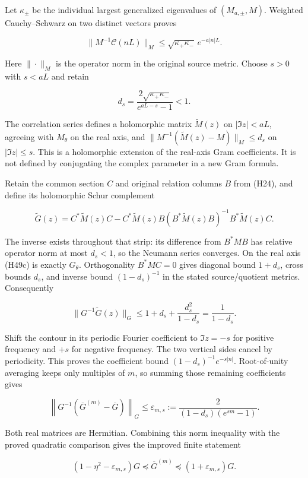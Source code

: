 \documentclass[
]{article}
\begin{document}
Let \(\kappa_\pm\) be the individual largest generalized eigenvalues of
\((M_{a,\pm},M)\). Weighted Cauchy--Schwarz on two distinct vectors
proves

\[
 \|M^{-1}\mathcal C(nL)\|_M
 \leq\sqrt{\kappa_+\kappa_-}\,e^{-a|n|L}.
 \tag{H49a}
\]

Here \(\|\cdot\|_M\) is the operator norm in the original source metric.
Choose \(s>0\) with \(s<aL\) and retain

\[
 d_s=\frac{2\sqrt{\kappa_+\kappa_-}}{e^{aL-s}-1}<1.
 \tag{H49b}
\]

The correlation series defines a holomorphic matrix \(\widetilde M(z)\)
on \(|\Im z|<aL\), agreeing with \(M_\theta\) on the real axis, and
\(\|M^{-1}(\widetilde M(z)-M)\|_M\leq d_s\) on \(|\Im z|\leq s\). This
is a holomorphic extension of the real-axis Gram coefficients. It is not
defined by conjugating the complex parameter in a new Gram formula.

Retain the common section \(C\) and original relation columns \(B\) from
(H24), and define its holomorphic Schur complement

\[
 \widetilde G(z)=C^*\widetilde M(z)C
 -C^*\widetilde M(z)B
 (B^*\widetilde M(z)B)^{-1}B^*\widetilde M(z)C.
 \tag{H49c}
\]

The inverse exists throughout that strip: its difference from \(B^*MB\)
has relative operator norm at most \(d_s<1\), so the Neumann series
converges. On the real axis (H49c) is exactly \(G_\theta\).
Orthogonality \(B^*MC=0\) gives diagonal bound \(1+d_s\), cross bounds
\(d_s\), and inverse bound \((1-d_s)^{-1}\) in the stated
source/quotient metrics. Consequently

\[
 \|G^{-1}\widetilde G(z)\|_G
 \leq1+d_s+\frac{d_s^2}{1-d_s}
 =\frac1{1-d_s}.
 \tag{H49d}
\]

Shift the contour in its periodic Fourier coefficient to \(\Im z=-s\)
for positive frequency and \(+s\) for negative frequency. The two
vertical sides cancel by periodicity. This proves the coefficient bound
\((1-d_s)^{-1}e^{-s|n|}\). Root-of-unity averaging keeps only multiples
of \(m\), so summing those remaining coefficients gives

\[
 \left\|G^{-1}(\overline G^{(m)}-\overline G)\right\|_G
 \leq\varepsilon_{m,s}
 :=\frac{2}{(1-d_s)(e^{sm}-1)}.
 \tag{H49e}
\]

Both real matrices are Hermitian. Combining this norm inequality with
the proved quadratic comparison gives the improved finite statement

\[
 (1-\eta^2-\varepsilon_{m,s})G
 \preceq\overline G^{(m)}
 \preceq(1+\varepsilon_{m,s})G.
 \tag{H49f}
\]
\end{document}
